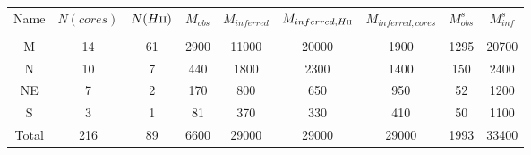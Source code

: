 \begin{table*}[htp]
\begin{tabular}{ccccccccc}
\label{tab:clustermassestimates}
Name & $N(cores)$ & $N(H\textsc{ii})$ & $M_{obs}$ & $M_{inferred}$ & $M_{inferred, H\textsc{ii}}$ & $M_{inferred, cores}$ & $M_{obs}^s$ & $M_{inf}^s$ \\
 &  &  &  &  &  &  &  &  \\
\hline
M & 14 & 61 & 2900 & 11000 & 20000 & 1900 & 1295 & 20700 \\
N & 10 & 7 & 440 & 1800 & 2300 & 1400 & 150 & 2400 \\
NE & 7 & 2 & 170 & 800 & 650 & 950 & 52 & 1200 \\
S & 3 & 1 & 81 & 370 & 330 & 410 & 50 & 1100 \\
Total & 216 & 89 & 6600 & 29000 & 29000 & 29000 & 1993 & 33400 \\
\hline
\end{tabular}
\end{table*}

